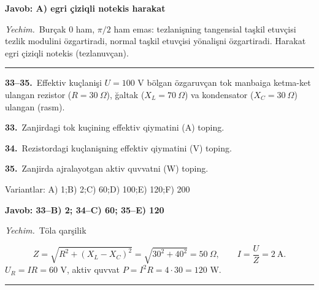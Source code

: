 \documentclass[11pt,a4paper]{article}
\begin{document}
\noindent\colorbox{gray!12}{\parbox{\dimexpr\linewidth-2\fboxsep}{\textbf{Javob: A) egri çiziqli notekis harakat}}}\par\smallskip
\noindent\textit{Yechim.}\ Burçak $0$ ham, $\pi/2$ ham emas: tezlanişning tangensial taşkil etuvçisi tezlik modulini özgartiradi, normal taşkil etuvçisi yönalişni özgartiradi. Harakat egri çiziqli notekis (tezlanuvçan).\par\par\medskip\hrule\medskip
\newpage\noindent\textbf{33–35.}\ Effektiv kuçlanişi $U=100$ V bölgan özgaruvçan tok manbaiga ketma-ket ulangan rezistor ($R=30\ \Omega$), ğaltak ($X_L=70\ \Omega$) va kondensator ($X_C=30\ \Omega$) ulangan (rasm).\par\medskip
\begin{center}\end{center}
\noindent\textbf{33.}\ Zanjirdagi tok kuçining effektiv qiymatini (A) toping.\par
\noindent\textbf{34.}\ Rezistordagi kuçlanişning effektiv qiymatini (V) toping.\par
\noindent\textbf{35.}\ Zanjirda ajralayotgan aktiv quvvatni (W) toping.\par
\noindent Variantlar: A) 1;\quad B) 2;\quad C) 60;\quad D) 100;\quad E) 120;\quad F) 200\par\smallskip
\noindent\colorbox{gray!12}{\parbox{\dimexpr\linewidth-2\fboxsep}{\textbf{Javob: 33--B) 2; 34--C) 60; 35--E) 120}}}\par\smallskip
\noindent\textit{Yechim.}\ Töla qarşilik\par
\[Z=\sqrt{R^2+(X_L-X_C)^2}=\sqrt{30^2+40^2}=50\ \Omega,\qquad I=\frac{U}{Z}=2\ \text{A}.\]
$U_R=IR=60$ V, aktiv quvvat $P=I^2R=4\cdot30=120$ W.\par\par\medskip\hrule\medskip
\end{document}
